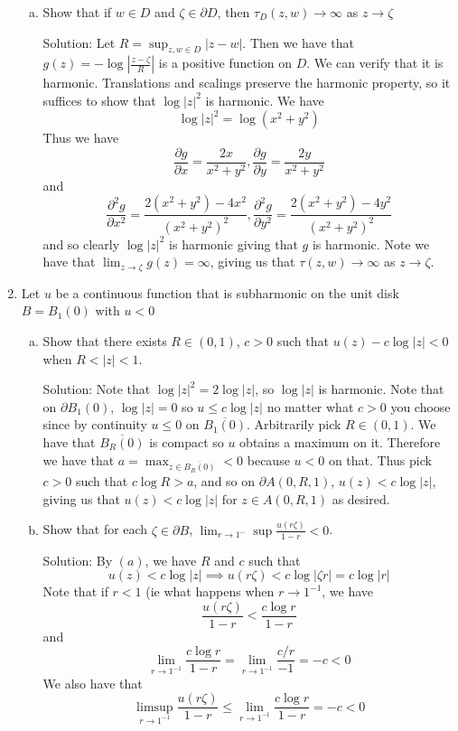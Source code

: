 \documentclass[11pt]{article}
\begin{document}
\begin{enumerate}[(1)]
\begin{enumerate}[(a)]
\item Show that if $w \in D$ and $\zeta \in \partial D$, then $\tau_D(z,w) \to \infty$ as $z \to \zeta$

Solution: Let $R = \sup_{z, w \in D} |z - w|$. Then we have that $g(z) = -\log |\frac{z - \zeta}{R}|$ is a positive function on $D$. We can verify that it is harmonic. Translations and scalings preserve the harmonic property, so it suffices to show that $\log |z|^2$ is harmonic. We have 
$$ \log |z|^2 = \log(x^2 + y^2) $$
Thus we have 
$$ \frac{\partial g}{\partial x} = \frac{2x}{x^2 + y^2}, \frac{\partial g}{\partial y} = \frac{2y}{x^2 + y^2} $$
and 
$$ \frac{\partial^2g}{\partial x^2} = \frac{2(x^2 + y^2) - 4x^2}{(x^2 + y^2)^2}, \frac{\partial^2g}{\partial y^2} = \frac{2(x^2 + y^2) - 4y^2}{(x^2 + y^2)^2} $$
and so clearly $\log |z|^2$ is harmonic giving that $g$ is harmonic. Note we have that $\lim_{z\to \zeta} g(z) = \infty$, giving us that $\tau(z, w) \to \infty$ as $z \to \zeta$.

\end{enumerate}

\item Let $u$ be a continuous function that is subharmonic on the unit disk $B = B_1(0)$ with $u < 0$

\begin{enumerate}[(a)]
\item Show that there exists $R \in (0,1)$, $c > 0$ such that $u(z) - c \log |z| < 0$ when $R < |z| < 1$.

Solution: Note that $\log |z|^2 = 2 \log |z|$, so $\log |z|$ is harmonic. Note that on $\partial B_1(0)$, $\log |z| = 0$ so $u \leq c \log |z|$ no matter what $c > 0$ you choose since by continuity $u \leq 0$ on $\overline{B_1(0)}$. Arbitrarily pick $R \in (0,1)$. We have that $\overline{B_R(0)}$ is compact so $u$ obtains a maximum on it. Therefore we have that $a = \max_{z \in \overline{B_R(0)}} < 0$ because $u < 0$ on that. Thus pick $c > 0$ such that $c \log R > a$, and so on $\partial A(0, R, 1)$, $u(z) < c \log|z|$, giving us that $u(z) < c \log |z|$ for $ z \in A(0, R, 1)$ as desired. 

\item Show that for each $\zeta \in \partial B$, $\lim_{r \to 1^-} \sup \frac{u(r\zeta)}{1-r} < 0$. 

Solution: By $(a)$, we have $R$ and $c$ such that 
$$ u(z) < c \log |z| \implies u(r \zeta) < c \log |\zeta r| = c \log |r|$$
Note that if $r < 1$ (ie what happens when $r \to 1^{-1}$, we have 
$$ \frac{u(r\zeta)}{1 - r} < \frac{c \log r}{1 - r} $$
and 
$$ \lim_{r \to 1^{-1}} \frac{c \log r}{1 - r} = \lim_{r \to 1^{-1}} \frac{c /r}{-1} = -c < 0 $$
We also have that 
$$ \limsup_{r \to 1^{-1}} \frac{u(r\zeta)}{1 - r} \leq  \lim_{r \to 1^{-1}} \frac{c \log r}{1 - r} = -c < 0 $$


\end{enumerate}

\end{enumerate}
\end{document}
